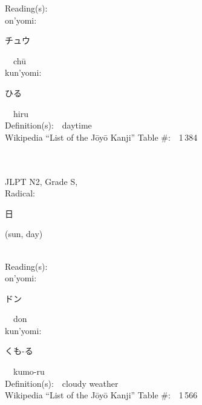 \begin{multicols}{2}
Reading(s):\ \ \\
{\hspace*{1em}}on'yomi:\ \ \\
{\hspace*{2em}}{\begin{CJK}{UTF8}{min} チュウ \end{CJK}}\ \ ch\=u\ \ \\
{\hspace*{1em}}kun'yomi:\ \ \\
{\hspace*{2em}}{\begin{CJK}{UTF8}{min} ひる \end{CJK}}\ \ hiru\ \ \\
Definition(s):\ \ daytime \\
Wikipedia ``List of the J\=oy\=o Kanji'' Table \#:\ \ 1\,384 \\
\ \ \\
{\fontsize{34pt}{40pt}  }\ \ \\  %
{JLPT N2, Grade S, \\Radical:\ \ {\begin{CJK}{UTF8}{min} 日 \end{CJK}} (sun, day) } \\
Reading(s):\ \ \\
{\hspace*{1em}}on'yomi:\ \ \\
{\hspace*{2em}}{\begin{CJK}{UTF8}{min} ドン \end{CJK}}\ \ don\ \ \\
{\hspace*{1em}}kun'yomi:\ \ \\
{\hspace*{2em}}{\begin{CJK}{UTF8}{min} くも-る \end{CJK}}\ \ kumo-ru\ \ \\
Definition(s):\ \ cloudy weather \\
Wikipedia ``List of the J\=oy\=o Kanji'' Table \#:\ \ 1\,566 \\
\ \ \\
{\fontsize{34pt}{40pt}  }\ \ \\  %

\end{multicols}
